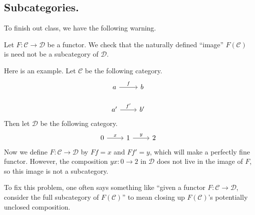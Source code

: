 \subsection{Subcategories.}
To finish out class, we have the following warning.
\begin{warn}
	Let $F:\mathcal C\to\mathcal D$ be a functor. We check that the naturally defined ``image'' $F(\mathcal C)$ is need not be a subcategory of $\mathcal D$.
\end{warn}
Here is an example. Let $\mathcal C$ be the following category.
\[\begin{tikzcd}
	a & b \\
	{a'} & {b'}
	\arrow["f", from=1-1, to=1-2]
	\arrow["{f'}", from=2-1, to=2-2]
\end{tikzcd}\]
Then let $\mathcal D$ be the following category.
\[\begin{tikzcd}
	0 & 1 & 2
	\arrow["x", from=1-1, to=1-2]
	\arrow["y", from=1-2, to=1-3]
\end{tikzcd}\]
Now we define $F:\mathcal C\to\mathcal D$ by $Ff=x$ and $Ff'=y$, which will make a perfectly fine functor. However, the composition $yx:0\to2$ in $\mathcal D$ does not live in the image of $F$, so this image is not a subcategory.

To fix this problem, one often says something like ``given a functor $F:\mathcal C\to\mathcal D$, consider the full subcategory of $F(\mathcal C)$'' to mean closing up $F(\mathcal C)$'s potentially unclosed composition.